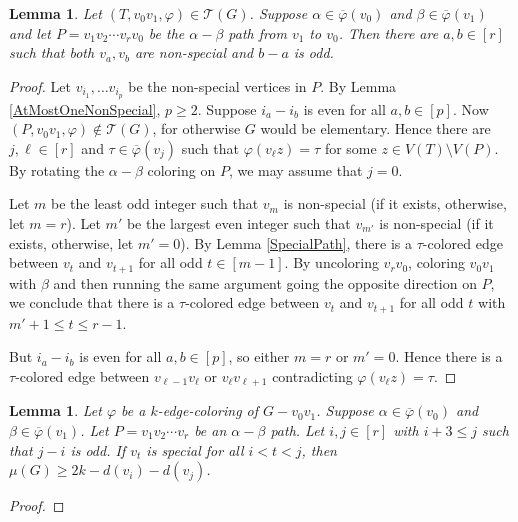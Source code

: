 \documentclass[12pt]{amsart}
\theoremstyle{plain}
\newtheorem{lem}[thm]{Lemma}
\theoremstyle{definition}
\theoremstyle{remark}
\newcommand{\fancy}[1]{\mathcal{#1}}
\newcommand{\T}{\fancy{T}}
\newcommand{\irange}[1]{\left[#1\right]}
\newcommand{\vph}{\varphi}
\newcommand{\vphn}{\overline{\varphi}}
\begin{document}
\begin{lem}\label{HelperThree}
Let $(T, v_0v_1, \vph) \in \T(G)$. Suppose $\alpha \in \vphn(v_0)$ and $\beta \in \vphn(v_1)$ and let $P = v_1v_2\cdots v_rv_0$ be the $\alpha-\beta$ path from $v_1$ to $v_0$.  Then there
are $a,b \in \irange{r}$ such that both $v_a, v_b$ are non-special and $b - a$ is odd.
\end{lem}
\begin{proof}
Let $v_{i_1}, \ldots v_{i_p}$ be the non-special vertices in $P$. By Lemma \ref{AtMostOneNonSpecial}, $p \ge 2$.  Suppose $i_a - i_b$ is even for all $a,b \in \irange{p}$.  
Now $(P, v_0v_1, \vph) \not \in \T(G)$, for otherwise $G$ would be elementary.  Hence there are $j,\ell \in \irange{r}$ and $\tau \in \vphn(v_j)$ such that $\vph(v_\ell z) = \tau$ for some $z \in V(T) \setminus V(P)$.
By rotating the $\alpha-\beta$ coloring on $P$, we may assume that $j=0$.

Let $m$ be the least odd integer such that $v_m$ is non-special (if it exists, otherwise, let $m=r$).
Let $m'$ be the largest even integer such that $v_{m'}$ is non-special (if it exists, otherwise, let $m'=0$).
By Lemma \ref{SpecialPath}, there is a $\tau$-colored edge between $v_t$ and $v_{t+1}$ for all odd $t \in \irange{m-1}$.
By uncoloring $v_rv_0$, coloring $v_0v_1$ with $\beta$ and then running the same argument going the opposite direction on $P$, we conclude that 
there is a $\tau$-colored edge between $v_t$ and $v_{t+1}$ for all odd $t$ with $m' + 1 \le t \le r-1$.

But $i_a - i_b$ is even for all $a,b \in \irange{p}$, so either $m=r$ or $m'=0$.  Hence there is a $\tau$-colored edge between $v_{\ell-1} v_{\ell}$ or $v_{\ell} v_{\ell + 1}$ contradicting $\vph(v_\ell z) = \tau$.
\end{proof}

\begin{lem}\label{HelperOne}
Let $\vph$ be a $k$-edge-coloring of $G-v_0v_1$.  Suppose $\alpha \in \vphn(v_0)$ and $\beta \in \vphn(v_1)$.  
Let $P = v_1v_2\cdots v_r$ be an $\alpha-\beta$ path.  Let $i,j \in \irange{r}$ with $i + 3 \le j$ such that $j-i$ is odd.  If $v_t$ is special for all $i < t < j$, then
$\mu(G) \ge 2k - d(v_i) - d(v_j)$.
\end{lem}
\begin{proof}
\end{proof}
\end{document}

